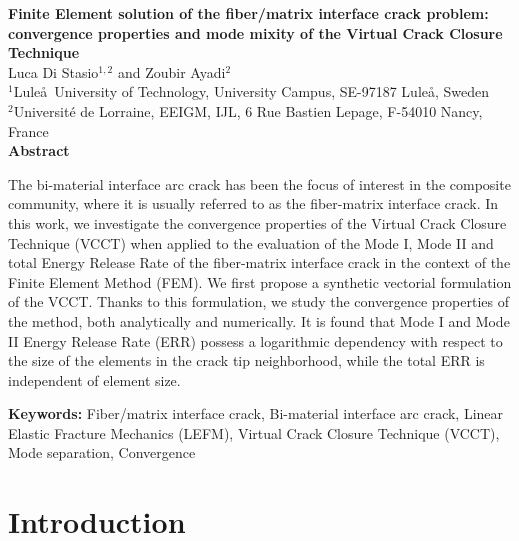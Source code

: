 
\thispagestyle{plain}
\begin{center}
\Large\textbf{Finite Element solution of the fiber/matrix interface crack problem: convergence properties and mode mixity of the Virtual Crack Closure Technique}\\
\vspace{10mm}
\normalsize Luca Di Stasio$^{1,2}$ and Zoubir Ayadi$^{2}$\\
\vspace{5mm}
\normalsize $^{1}$Lule\aa\ University of Technology, University Campus, SE-97187 Lule\aa, Sweden\\
\normalsize $^{2}$Universit\'e de Lorraine, EEIGM, IJL, 6 Rue Bastien Lepage, F-54010 Nancy, France\\
\vspace{15mm}
\textbf{Abstract}\\
\end{center}

The bi-material interface arc crack has been the focus of interest in the composite community, where it is usually referred to as the fiber-matrix interface crack. In this work, we investigate the convergence properties of the Virtual Crack Closure Technique (VCCT) when applied to the evaluation of the Mode I, Mode II and total Energy Release Rate of the fiber-matrix interface crack in the context of the Finite Element Method (FEM). We first propose a synthetic vectorial formulation of the VCCT. Thanks to this formulation, we study the convergence properties of the method, both analytically and numerically. It is found that Mode I and Mode II Energy Release Rate (ERR) possess a logarithmic dependency with respect to the size of the elements in the crack tip neighborhood, while the total ERR is independent of element size.

\vspace{5mm}

\textbf{Keywords:} Fiber/matrix interface crack, Bi-material interface arc crack, Linear Elastic Fracture Mechanics (LEFM), Virtual Crack Closure Technique (VCCT), Mode separation, Convergence

\section{Introduction}\label{paperA:sec:intro}

